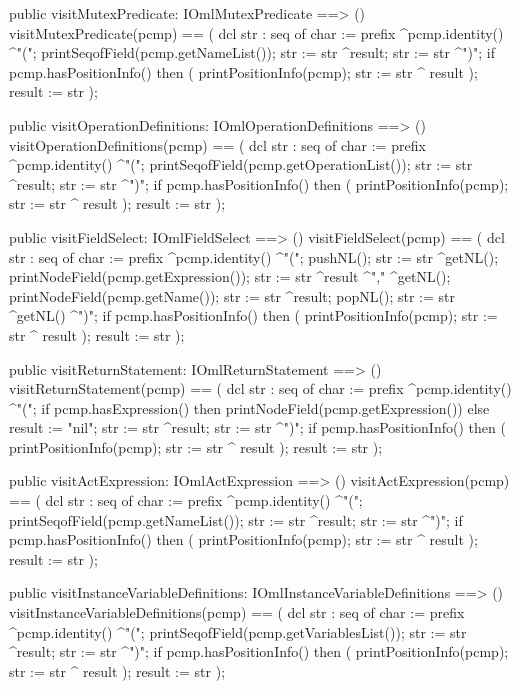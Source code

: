 \begin{vdm_al}
  public visitMutexPredicate: IOmlMutexPredicate ==> ()
  visitMutexPredicate(pcmp) ==
    ( dcl str : seq of char := prefix ^pcmp.identity() ^"(";
      printSeqofField(pcmp.getNameList());
      str := str ^result;
      str := str ^")";
      if pcmp.hasPositionInfo()
      then ( printPositionInfo(pcmp);
             str := str ^ result );
      result := str );

  public visitOperationDefinitions: IOmlOperationDefinitions ==> ()
  visitOperationDefinitions(pcmp) ==
    ( dcl str : seq of char := prefix ^pcmp.identity() ^"(";
      printSeqofField(pcmp.getOperationList());
      str := str ^result;
      str := str ^")";
      if pcmp.hasPositionInfo()
      then ( printPositionInfo(pcmp);
             str := str ^ result );
      result := str );

  public visitFieldSelect: IOmlFieldSelect ==> ()
  visitFieldSelect(pcmp) ==
    ( dcl str : seq of char := prefix ^pcmp.identity() ^"(";
      pushNL();
      str := str ^getNL();
      printNodeField(pcmp.getExpression());
      str := str ^result ^"," ^getNL();
      printNodeField(pcmp.getName());
      str := str ^result;
      popNL();
      str := str ^getNL() ^")";
      if pcmp.hasPositionInfo()
      then ( printPositionInfo(pcmp);
             str := str ^ result );
      result := str );

  public visitReturnStatement: IOmlReturnStatement ==> ()
  visitReturnStatement(pcmp) ==
    ( dcl str : seq of char := prefix ^pcmp.identity() ^"(";
      if pcmp.hasExpression()
      then printNodeField(pcmp.getExpression())
      else result := "nil";
      str := str ^result;
      str := str ^")";
      if pcmp.hasPositionInfo()
      then ( printPositionInfo(pcmp);
             str := str ^ result );
      result := str );

  public visitActExpression: IOmlActExpression ==> ()
  visitActExpression(pcmp) ==
    ( dcl str : seq of char := prefix ^pcmp.identity() ^"(";
      printSeqofField(pcmp.getNameList());
      str := str ^result;
      str := str ^")";
      if pcmp.hasPositionInfo()
      then ( printPositionInfo(pcmp);
             str := str ^ result );
      result := str );

  public visitInstanceVariableDefinitions: IOmlInstanceVariableDefinitions ==> ()
  visitInstanceVariableDefinitions(pcmp) ==
    ( dcl str : seq of char := prefix ^pcmp.identity() ^"(";
      printSeqofField(pcmp.getVariablesList());
      str := str ^result;
      str := str ^")";
      if pcmp.hasPositionInfo()
      then ( printPositionInfo(pcmp);
             str := str ^ result );
      result := str );


\end{vdm_al}
